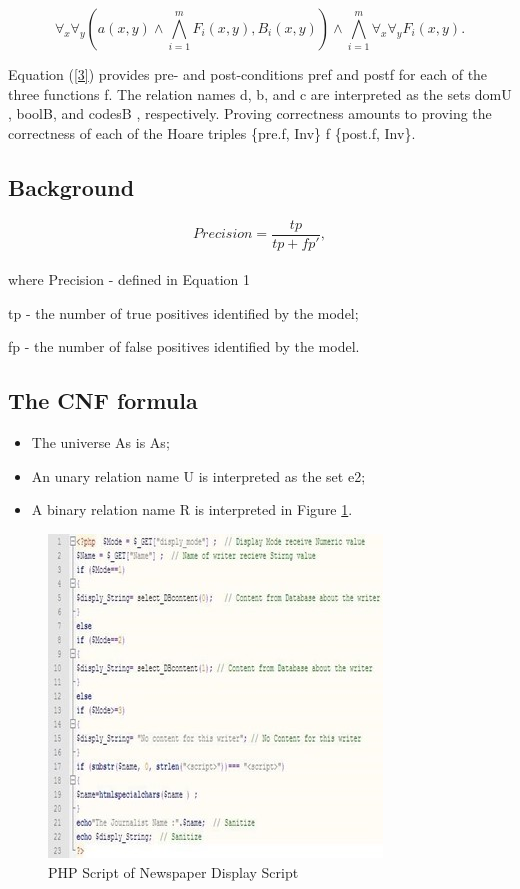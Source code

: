 \documentclass[12pt]{acmart}
\begin{document}
\begin{equation}
    \forall_x \forall_y (a(x,y) \wedge \bigwedge_{i=1}^mF_i(x,y), B_i(x,y)) \wedge \bigwedge_{i=1}^m \forall_x \forall_y F_i(x,y).
    \label{2}
\end{equation}
 
 Equation (\ref{3}) provides pre- and post-conditions pref and postf for each of the three functions f. The relation names d, b, and c are interpreted as the sets domU   , boolB, and codesB  , respectively. Proving correctness amounts to proving the correctness of each of the Hoare triples \{pre.f, Inv\}  f  \{post.f, Inv\}.

\subsection{Background}

\begin{equation}
    Precision = \frac{tp}{tp + fp'},
    \label{3}
\end{equation}\\
where Precision - defined in Equation 1\par
    tp - the number of true positives identified by the model;\par
	fp - the number of false positives identified by the model.

\subsection{The CNF formula}

\begin{itemize}
    \item The universe As is As;
    \item An unary relation name U is interpreted as the set e2;
    \item A binary relation name R is interpreted in Figure \ref{pic2}.
\end{itemize}

\begin{figure}[H]
    \centering
    \includegraphics{Picture2.jpg}
    \caption{PHP Script of Newspaper Display Script}
    \label{pic2}
\end{figure}
\end{document}
